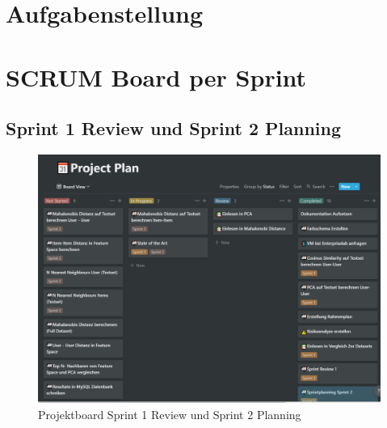 % 

\chapter{Aufgabenstellung}
\label{app:sec:Aufgabenstellung}


\chapter{SCRUM Board per Sprint}
\section*{Sprint 1 Review und Sprint 2 Planning}
\begin{figure}[htb]
	\centering
	\includegraphics[keepaspectratio,width=\linewidth]{img/Projektboard Review Sprint1 Planning Sprint2.png}
	\caption{Projektboard Sprint 1 Review und Sprint 2 Planning}
	\label{fig:Spri}
\end{figure}